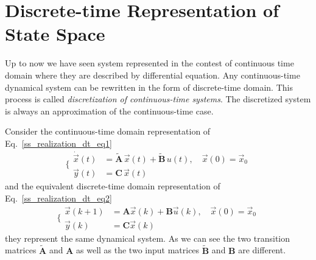 \documentclass[11pt,a4paper,oneside]{book}
\numberwithin{equation}{section}
\theoremstyle{it}
\theoremstyle{definition}
\begin{document}
\section{Discrete-time Representation of State Space}
Up to now we have seen system represented in the contest of continuous time 
domain where they are described by differential equation. Any continuous-time 
dynamical system can be rewritten in the form of discrete-time domain. This 
process is called \textit{discretization of continuous-time systems}. The 
discretized system is always an approximation of the continuous-time case.

Consider the continuous-time domain representation of 
Eq.~\eqref{ss_realization_dt_eq1}
\begin{equation}\label{ss_realization_dt_eq1}
	\Bigg\{ 	\begin{aligned}
		\dot{\vec{x}}(t)  &= \tilde{\mathbf{A}} \,\vec{x}(t) +\tilde{\mathbf{B}} \,u(t), \quad\vec{x}(0)=\vec{x}_0 \\[6pt]
		\vec{y}(t)  &= {\mathbf{C}} \,\vec{x}(t)
	\end{aligned}
\end{equation}
and the equivalent discrete-time domain representation of 
Eq.~\eqref{ss_realization_dt_eq2}
\begin{equation}\label{ss_realization_dt_eq2}
	\Bigg\{ 	\begin{aligned}
		\vec{x}(k+1) & = \mathbf{A}\vec{x}(k) + \mathbf{B}\vec{u}(k),\quad\vec{x}(0)=\vec{x}_0 \\[6pt]
		\vec{y}(k) & = \mathbf{C}\vec{x}(k)
	\end{aligned}
\end{equation}
they represent the same dynamical system. As we can see the two transition 
matrices $\tilde{\mathbf{A}}$ and $\mathbf{A}$ as well as the two input matrices
$\tilde{\mathbf{B}}$ and $\mathbf{B}$ are different.
\end{document}
